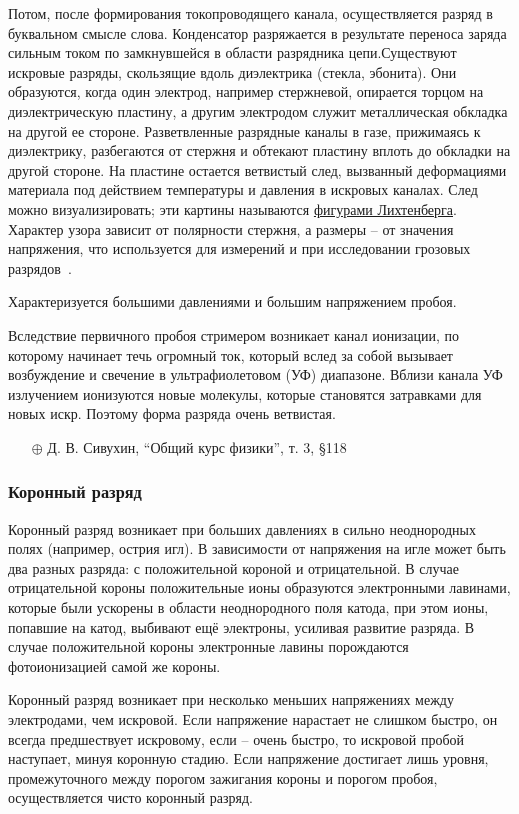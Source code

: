 \documentclass[10pt, a4paper]{article}
\begin{document}
Потом, после формирования токопроводящего канала, осуществляется разряд в буквальном смысле слова. Конденсатор разряжается в результате переноса заряда сильным током по замкнувшейся в области разрядника цепи.Существуют искровые разряды, скользящие вдоль диэлектрика (стекла, эбонита). Они образуются, когда один электрод, например стержневой, опирается торцом на диэлектрическую пластину, а другим электродом служит металлическая обкладка на другой ее стороне. Разветвленные разрядные каналы в газе, прижимаясь к диэлектрику, разбегаются от стержня и обтекают пластину вплоть до обкладки на другой стороне. На пластине остается ветвистый след, вызванный деформациями материала под действием температуры и давления в искровых каналах. След можно визуализировать; эти картины называются \uline{фигурами Лихтенберга}. Характер узора зависит от полярности стержня, а размеры -- от значения напряжения, что используется для измерений и при исследовании грозовых разрядов~\cite{raizer}.

Характеризуется большими давлениями и большим напряжением пробоя.

Вследствие первичного пробоя стримером возникает канал ионизации, по которому начинает течь огромный ток, который вслед за собой вызывает возбуждение и свечение в ультрафиолетовом (УФ) диапазоне. Вблизи канала УФ излучением ионизуются новые молекулы, которые становятся затравками для новых искр. Поэтому форма разряда очень ветвистая.

\begin{itemize}
	\item[$\oplus$] Д. В. Сивухин, ``Общий курс физики'', т. 3, \S 118
\end{itemize}

\subsubsection{Коронный разряд}

Коронный разряд возникает при больших давлениях в сильно неоднородных полях (например, острия игл). В зависимости от напряжения на игле может быть два разных разряда: с положительной короной и отрицательной. В случае отрицательной короны положительные ионы образуются электронными лавинами, которые были ускорены в области неоднородного поля катода, при этом ионы, попавшие на катод, выбивают ещё электроны, усиливая развитие разряда. В случае положительной короны электронные лавины порождаются фотоионизацией самой же короны.

Коронный разряд возникает при несколько меньших напряжениях между электродами, чем искровой. Если напряжение нарастает не слишком быстро, он всегда предшествует искровому, если -- очень быстро, то искровой пробой наступает, минуя коронную стадию. Если напряжение достигает лишь уровня, промежуточного между порогом зажигания короны и порогом пробоя, осуществляется чисто коронный разряд.
\end{document}
